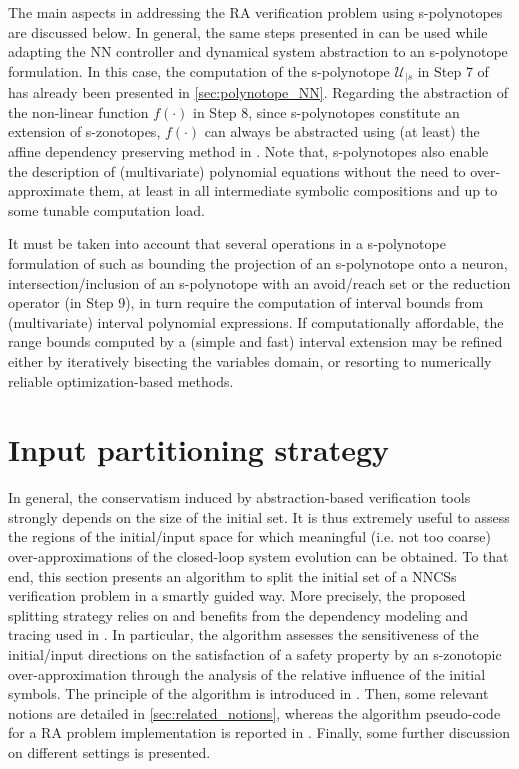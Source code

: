 \documentclass[journal]{IEEEtran}
\begin{document}
The main aspects in addressing the RA verification problem using s-polynotopes are discussed below. In general, the same steps presented in  can be used while adapting the NN controller and dynamical system abstraction to an s-polynotope formulation. In this case, the computation of the s-polynotope $\mathcal{U}_{|s}$ in Step 7 of  has already been presented in \cref{sec:polynotope_NN}. Regarding the abstraction of the non-linear function $f(\cdot)$ in Step 8, since s-polynotopes constitute an extension of s-zonotopes, $f(\cdot)$ can always be abstracted using (at least)  the affine dependency preserving method in  . Note that, s-polynotopes also enable the description of (multivariate) polynomial equations without the need to over-approximate them, at least in all intermediate symbolic compositions and up to some tunable computation load.

It must be taken into account that several operations in a s-polynotope formulation of  such as bounding the projection of an s-polynotope onto a neuron, intersection/inclusion of an s-polynotope with an avoid/reach set or the reduction operator (in Step 9), in turn require the  computation of interval bounds from (multivariate) interval polynomial expressions. If computationally affordable, the  range bounds computed by a (simple and fast) interval extension may be refined either by iteratively bisecting the variables domain, or resorting to numerically reliable optimization-based methods.



\section{Input partitioning strategy} \label{sec:partitioning}

In general, the conservatism induced by abstraction-based verification tools strongly depends on the size of the initial set. It is thus extremely useful to assess the regions of the initial/input space for which meaningful (i.e. not too coarse) over-approximations of the closed-loop system evolution can be obtained. To that end, this section  presents an algorithm to split the initial set of a NNCSs verification problem in a smartly guided way. More precisely, the proposed splitting strategy relies on and benefits from the dependency modeling and tracing used in . In particular, the algorithm assesses the sensitiveness of the initial/input directions on the satisfaction of a safety property by an s-zonotopic over-approximation through the analysis of the relative influence of the initial symbols. The principle of the algorithm is introduced in . Then, some relevant notions are detailed in \cref{sec:related_notions}, whereas the algorithm pseudo-code for a RA problem implementation is reported in . Finally, some further discussion on different settings is presented.
\end{document}
